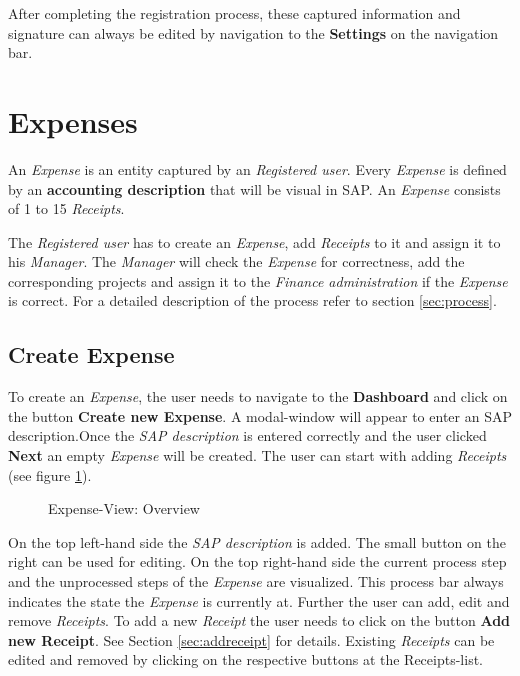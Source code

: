 After completing the registration process, these captured information and signature can always be edited by navigation to the \textbf{Settings} on the navigation bar.
\clearpage

\section{Expenses}

An \textit{Expense} is an entity captured by an \textit{Registered user}. Every \textit{Expense} is defined by an \textbf{accounting description} that will be visual in SAP. An \textit{Expense} consists of 1 to 15 \textit{Receipts}.

The \textit{Registered user} has to create an \textit{Expense}, add \textit{Receipts} to it and assign it to his \textit{Manager}. The \textit{Manager} will check the \textit{Expense} for correctness, add the corresponding projects and assign it to the \textit{Finance administration} if the \textit{Expense} is correct. For a detailed description of the process refer to section \ref{sec:process}.

\subsection{Create Expense}

To create an \textit{Expense}, the user needs to navigate to the \textbf{Dashboard} and click on the button \textbf{Create new Expense}. A modal-window will appear to enter an SAP description.\newline Once the \textit{SAP description} is entered correctly and the user clicked \textbf{Next} an empty \textit{Expense} will be created. The user can start with adding \textit{Receipts} (see figure \ref{fig:expensesitems-overview}).

\begin{figure}[H]
    \centering
    \caption{Expense-View: Overview}
    \label{fig:expensesitems-overview}
\end{figure}

On the top left-hand side the \textit{SAP description} is added. The small button on the right can be used for editing. On the top right-hand side the current process step and the unprocessed steps of the \textit{Expense} are visualized. This process bar always indicates the state the \textit{Expense} is currently at.\newline
Further the user can add, edit and remove \textit{Receipts}. To add a new \textit{Receipt} the user needs to click on the button \textbf{Add new Receipt}. See Section \ref{sec:addreceipt} for details.\newline
Existing \textit{Receipts} can be edited and removed by clicking on the respective buttons at the Receipts-list.


